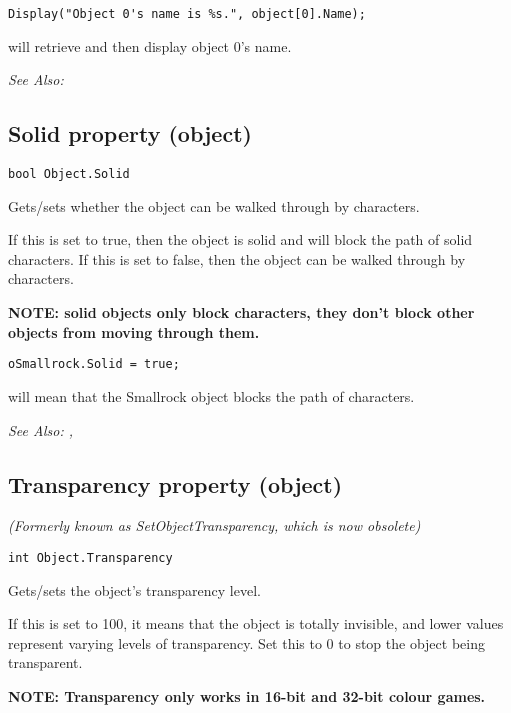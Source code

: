 \begin{verbatim}
Display("Object 0's name is %s.", object[0].Name);
\end{verbatim}
will retrieve and then display object 0's name.

\it{See Also:} 


\subsection{Solid property (object)}\label{Object.Solid}%

\begin{verbatim}
bool Object.Solid
\end{verbatim}
Gets/sets whether the object can be walked through by characters.

If this is set to true, then the object is solid and will block the path of solid
characters. If this is set to false, then the object can be walked through by
characters.

\bf{NOTE:} solid objects only block characters, they don't block other objects from
moving through them.

\begin{verbatim}
oSmallrock.Solid = true;
\end{verbatim}
will mean that the Smallrock object blocks the path of characters.

\it{See Also:} ,


\subsection{Transparency property (object)}\label{Object.Transparency}%

\it{(Formerly known as SetObjectTransparency, which is now obsolete)}

\begin{verbatim}
int Object.Transparency
\end{verbatim}
Gets/sets the object's transparency level.

If this is set to 100, it means that the object is totally invisible, and lower values
represent varying levels of transparency. Set this to 0 to stop the object being transparent.

\bf{NOTE:} Transparency only works in 16-bit and 32-bit colour games.

